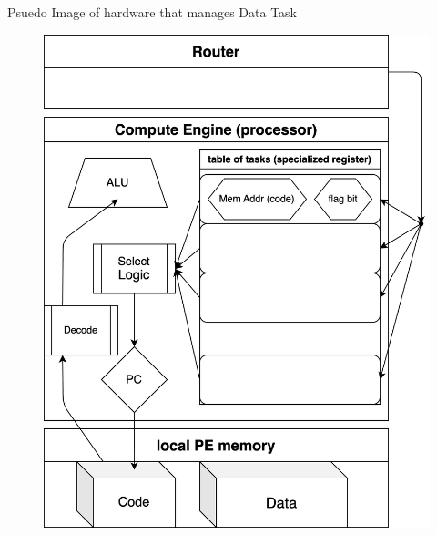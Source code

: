 \documentclass[dvipdfmx, 11pt, aspectratio=169]{beamer}   %
\begin{document}
\begin{frame}{Psuedo Image of hardware that manages Data Task}
\begin{figure}
    \includegraphics[scale=0.08]{img/npcGen.png}
\end{figure}
\end{frame}
\end{document}
